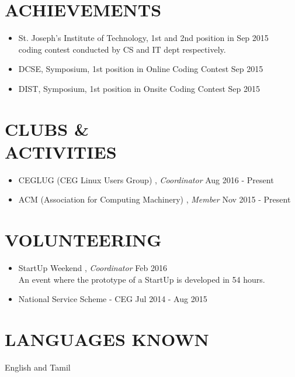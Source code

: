 \documentclass[margin, 10pt]{res} %
\begin{document}
\begin{resume}
\section{ACHIEVEMENTS}
\begin{itemize} 
\item St. Joseph's Institute of Technology, 1st and 2nd position in \hfill Sep 2015 \\ coding contest conducted by CS and IT dept respectively.
\item DCSE, Symposium, 1st position in Online Coding Contest \hfill Sep 2015
\item DIST, Symposium, 1st position in Onsite Coding Contest \hfill Sep 2015
\end{itemize}


\section{CLUBS \& \\ACTIVITIES}
\begin{itemize}
\item CEGLUG (CEG Linux Users Group) , {\sl Coordinator} \hfill Aug 2016 - Present
\item ACM (Association for Computing Machinery) , {\sl Member} \hfill Nov 2015 - Present
\end{itemize}

\section{VOLUNTEERING}
\begin{itemize}
\item StartUp Weekend , {\sl Coordinator} \hfill Feb 2016 \\
An event where the prototype of a StartUp is developed in 54 hours.
\item National Service Scheme - CEG \hfill Jul 2014 - Aug 2015 
\end{itemize}
\section{LANGUAGES KNOWN}  English and Tamil




 


\end{resume}
\end{document}
